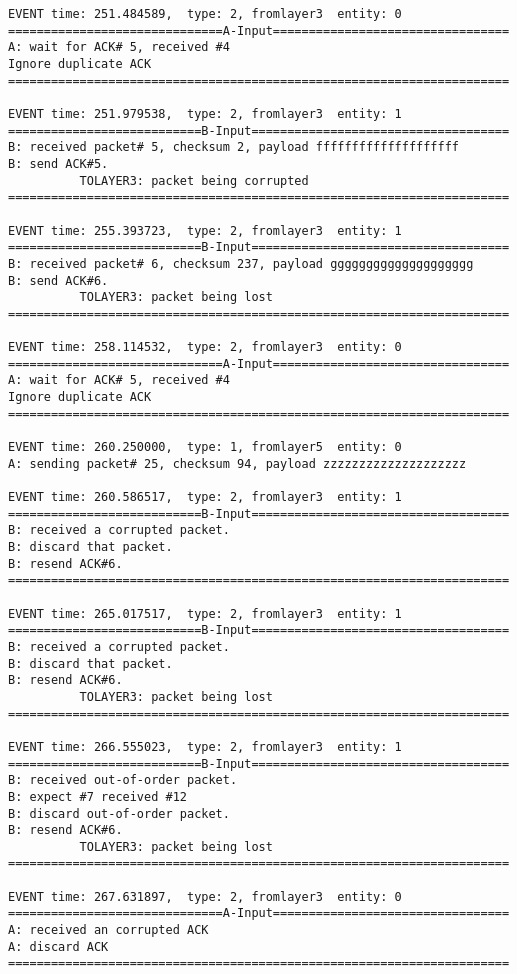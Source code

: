 \documentclass[12pt]{article}
\begin{document}
\begin{verbatim}
EVENT time: 251.484589,  type: 2, fromlayer3  entity: 0
==============================A-Input=================================
A: wait for ACK# 5, received #4
Ignore duplicate ACK
======================================================================

EVENT time: 251.979538,  type: 2, fromlayer3  entity: 1
===========================B-Input====================================
B: received packet# 5, checksum 2, payload ffffffffffffffffffff
B: send ACK#5.
          TOLAYER3: packet being corrupted
======================================================================

EVENT time: 255.393723,  type: 2, fromlayer3  entity: 1
===========================B-Input====================================
B: received packet# 6, checksum 237, payload gggggggggggggggggggg
B: send ACK#6.
          TOLAYER3: packet being lost
======================================================================

EVENT time: 258.114532,  type: 2, fromlayer3  entity: 0
==============================A-Input=================================
A: wait for ACK# 5, received #4
Ignore duplicate ACK
======================================================================

EVENT time: 260.250000,  type: 1, fromlayer5  entity: 0
A: sending packet# 25, checksum 94, payload zzzzzzzzzzzzzzzzzzzz

EVENT time: 260.586517,  type: 2, fromlayer3  entity: 1
===========================B-Input====================================
B: received a corrupted packet.
B: discard that packet.
B: resend ACK#6.
======================================================================

EVENT time: 265.017517,  type: 2, fromlayer3  entity: 1
===========================B-Input====================================
B: received a corrupted packet.
B: discard that packet.
B: resend ACK#6.
          TOLAYER3: packet being lost
======================================================================

EVENT time: 266.555023,  type: 2, fromlayer3  entity: 1
===========================B-Input====================================
B: received out-of-order packet.
B: expect #7 received #12
B: discard out-of-order packet.
B: resend ACK#6.
          TOLAYER3: packet being lost
======================================================================

EVENT time: 267.631897,  type: 2, fromlayer3  entity: 0
==============================A-Input=================================
A: received an corrupted ACK 
A: discard ACK
======================================================================


\end{verbatim}
\end{document}
